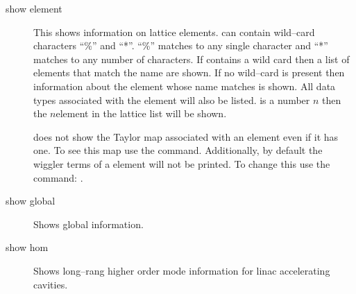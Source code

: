 {{{\begin{description}
  \item[show element]
This shows information on lattice elements.  can
contain wild--card characters ``\%'' and ``*''. ``\%'' matches to any
single character and ``*'' matches to any number of characters. If
 contains a wild card then a list of elements that
match the name are shown. If no wild--card is present then information
about the element whose name matches  is shown. All
data types associated with the element will also be
listed.  is a number $n$ then the $n$\Th element in the
lattice list will be shown.

 does not show the Taylor map associated with an element
even if it has one. To see this map use the 
command. Additionally, by default the wiggler terms of a 
 element will not be printed. To change this use the command:
.

  \item[show global]
Shows global information.

  \item[show hom]
Shows long--rang higher order mode information for linac accelerating cavities.


\end{description}}}}
